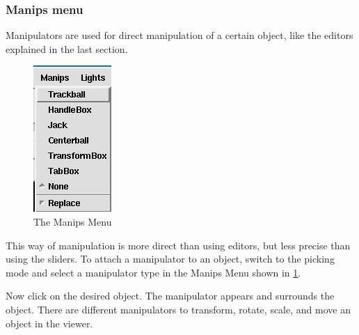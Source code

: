 \subsubsection{Manips menu}

Manipulators are used for direct manipulation of a certain object, like
the editors explained in the last section. 

 \latexonly
 \begin{figure}[htp]
  \begin{center}
   \includegraphics[scale=0.7]{renderer/pict/image19}
   \caption{The Manips Menu}
	\label{fig66}
  \end{center}
 \end{figure}
 \endlatexonly

This way of manipulation is more direct than using editors, but less precise
than using the sliders. To attach a manipulator to an object, switch to the
picking mode and select a manipulator type in the Manips Menu  shown in \ref{fig66}.

Now click on the desired object. The manipulator appears and surrounds
the object. There are different manipulators to transform, rotate, scale,
and move an object in the viewer. 

